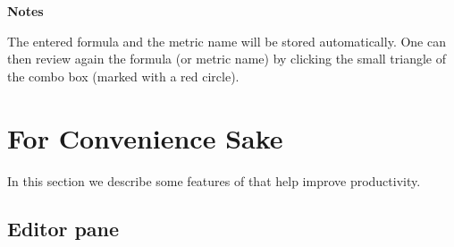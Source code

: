 \textbf{Notes}

The entered formula and the metric name will be stored automatically. One can then review again the formula (or metric name) by clicking the small triangle of the combo box (marked with a red circle).



\section{For Convenience Sake}

In this section we describe some features of \hpcviewer{} that help improve productivity.


\subsection{Editor pane}

